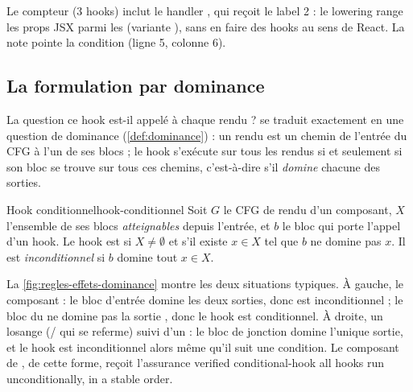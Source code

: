 Le compteur \og (3 hooks)\fg{} inclut le handler , qui reçoit le label 2 : le lowering range les props JSX  parmi les  (variante ), sans en faire des hooks au sens de React. La note pointe la condition  (ligne 5, colonne 6).

\subsection{La formulation par dominance}

La question \og ce hook est-il appelé à chaque rendu ?\fg{} se traduit exactement en une question de dominance (\cref{def:dominance}) : un rendu est un chemin de l'entrée du CFG à l'un de ses blocs  ; le hook s'exécute sur tous les rendus si et seulement si son bloc se trouve sur tous ces chemins, c'est-à-dire s'il \emph{domine} chacune des sorties.

\begin{definition}{Hook conditionnel}{hook-conditionnel}
Soit $G$ le CFG de rendu d'un composant, $X$ l'ensemble de ses blocs  \emph{atteignables} depuis l'entrée, et $b$ le bloc qui porte l'appel d'un hook. Le hook est  si $X \neq \emptyset$ et s'il existe $x \in X$ tel que $b$ ne domine pas $x$. Il est \emph{inconditionnel} si $b$ domine tout $x \in X$.
\end{definition}

La \cref{fig:regles-effets-dominance} montre les deux situations typiques. À gauche, le composant  : le bloc d'entrée domine les deux sorties, donc  est inconditionnel ; le bloc du  ne domine pas la sortie , donc le hook est conditionnel. À droite, un losange (/ qui se referme) suivi d'un  : le bloc de jonction domine l'unique sortie, et le hook est inconditionnel alors même qu'il suit une condition. Le composant  de , de cette forme, reçoit l'assurance \og verified conditional-hook all hooks run unconditionally, in a stable order\fg{}.

